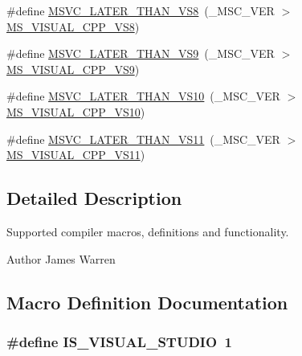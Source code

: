 \begin{DoxyCompactItemize}
\item 
\#define \hyperlink{compiler_8h_a3aa56032296678f21daa253500748995}{M\-S\-V\-C\-\_\-\-L\-A\-T\-E\-R\-\_\-\-T\-H\-A\-N\-\_\-\-V\-S8}~(\-\_\-\-M\-S\-C\-\_\-\-V\-E\-R $>$ \hyperlink{compiler_8h_a8d5296555daf8174a33c160b74544b83}{M\-S\-\_\-\-V\-I\-S\-U\-A\-L\-\_\-\-C\-P\-P\-\_\-\-V\-S8})
\item 
\#define \hyperlink{compiler_8h_a75e803ab5757767469727263545f9a8a}{M\-S\-V\-C\-\_\-\-L\-A\-T\-E\-R\-\_\-\-T\-H\-A\-N\-\_\-\-V\-S9}~(\-\_\-\-M\-S\-C\-\_\-\-V\-E\-R $>$ \hyperlink{compiler_8h_a3ab56482f6de80825bbeab1ac53c5c2b}{M\-S\-\_\-\-V\-I\-S\-U\-A\-L\-\_\-\-C\-P\-P\-\_\-\-V\-S9})
\item 
\#define \hyperlink{compiler_8h_ae9c1bfa45d063a435f0bd27ddf712488}{M\-S\-V\-C\-\_\-\-L\-A\-T\-E\-R\-\_\-\-T\-H\-A\-N\-\_\-\-V\-S10}~(\-\_\-\-M\-S\-C\-\_\-\-V\-E\-R $>$ \hyperlink{compiler_8h_a963332af49ce1d9aa3728e52afb50f71}{M\-S\-\_\-\-V\-I\-S\-U\-A\-L\-\_\-\-C\-P\-P\-\_\-\-V\-S10})
\item 
\#define \hyperlink{compiler_8h_a43722d19695f9c0c2079fdaa8f021340}{M\-S\-V\-C\-\_\-\-L\-A\-T\-E\-R\-\_\-\-T\-H\-A\-N\-\_\-\-V\-S11}~(\-\_\-\-M\-S\-C\-\_\-\-V\-E\-R $>$ \hyperlink{compiler_8h_a24c48fd4189f4008595d93e3df426a35}{M\-S\-\_\-\-V\-I\-S\-U\-A\-L\-\_\-\-C\-P\-P\-\_\-\-V\-S11})
\end{DoxyCompactItemize}


\subsection{Detailed Description}
Supported compiler macros, definitions and functionality. \begin{DoxyAuthor}{Author}
James Warren 
\end{DoxyAuthor}


\subsection{Macro Definition Documentation}
\subsubsection[{I\-S\-\_\-\-V\-I\-S\-U\-A\-L\-\_\-\-S\-T\-U\-D\-I\-O}]{\setlength{\rightskip}{0pt plus 5cm}\#define I\-S\-\_\-\-V\-I\-S\-U\-A\-L\-\_\-\-S\-T\-U\-D\-I\-O~1}\label{compiler_8h_a83066e93cc60e5e161e16a95080a41cd}
